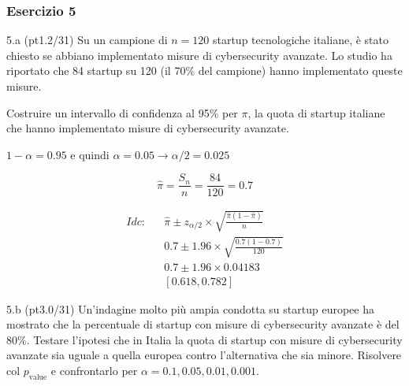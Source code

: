 \documentclass[
  10pt,
]{article}
\begin{document}
\subsubsection{Esercizio 5}\label{esercizio-5}

5.a (pt\hspace{.1em}1.2/31) Su un campione di \(n = 120\) startup tecnologiche italiane, è stato chiesto se abbiano implementato misure di cybersecurity avanzate. Lo studio ha riportato che 84 startup su 120 (il 70\% del campione) hanno implementato queste misure.

Costruire un intervallo di confidenza al 95\% per \(\pi\), la quota di startup italiane che hanno implementato misure di cybersecurity avanzate.

\begin{sol}
\(1-\alpha =0.95\) e quindi \(\alpha=0.05\rightarrow \alpha/2=0.025\)

\[
  \hat\pi = \frac{S_n}n = \frac{ 84 }{ 120 }= 0.7 
\]

\begin{eqnarray*}
  Idc: & &  \hat\pi \pm  z_{\alpha/2} \times \sqrt{\frac{\hat\pi(1-\hat\pi)}{n}} \\
     & &  0.7 \pm  1.96 \times \sqrt{\frac{ 0.7 (1- 0.7 )}{ 120 }} \\
     & &  0.7 \pm  1.96 \times  0.04183 \\
     & & [ 0.618 ,  0.782 ]
\end{eqnarray*}

\end{sol}

5.b (pt\hspace{.1em}3.0/31) Un'indagine molto più ampia condotta su startup europee ha mostrato che la percentuale di startup con misure di cybersecurity avanzate è del 80\%. Testare l'ipotesi che in Italia la quota di startup con misure di cybersecurity avanzate sia uguale a quella europea contro l'alternativa che sia minore. Risolvere col \(p_\text{value}\) e confrontarlo per \(\alpha=0.1,0.05,0.01,0.001\).
\end{document}
